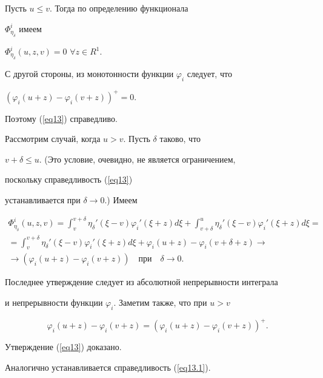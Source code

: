 \begin{pf}


Пусть $u{ \leq} v$. Тогда по определению функционала 


$\Phi^{i}_{\eta_{\delta}}$ имеем


$\Phi^{i}_{\eta_{\delta}}(u, z, v){=}0$ $\forall z \in R^{1}$. 


С другой стороны, из монотонности функции $ \varphi_{i} $ следует, что 


$(\varphi_{i}(u+z)-\varphi_{i}(v+z))^{+}=0$.


Поэтому (\ref{eq13}) справедливо.





Рассмотрим случай, когда $u > v$. Пусть $\delta$ таково, что


$v+\delta \leq u$. (Это условие, очевидно, не является ограничением, 


поскольку справедливость (\ref{eq13}) 


устанавливается при $\delta \rightarrow 0$.) Имеем 


\begin{multline*}


\Phi_{\eta_{\delta}}^{i}(u,z,v) = \int_{v}^{v+\delta}


{\eta_{\delta}}'(\xi-v) {\varphi_{i}}' (\xi+z) d \xi+


\int_{v+\delta}^{u}


{\eta_{\delta}}'(\xi-v) {\varphi_{i}}' (\xi+z) d \xi= \\


%


\displaystyle


=\int_{v}^{v+\delta}


{\eta_{\delta}}'(\xi-v) {\varphi_{i}}' (\xi+z) d \xi+


\varphi_{i}(u+z)-\varphi_{i}(v+\delta+z) \rightarrow \\


%


\rightarrow (\varphi_{i} (u+z)-\varphi_{i}(v+z))


\quad \text{при} \quad \delta \rightarrow 0.


\end{multline*}


Последнее утверждение следует из абсолютной непрерывности интеграла


и непрерывности функции $\varphi_{i}$. Заметим также, что при $u > v$ 


$$ 


\varphi_{i}(u+z)-\varphi_{i}(v+z)=(\varphi_{i} (u+z)-\varphi_{i}(v+z))^{+}.


$$


Утверждение (\ref{eq13}) доказано.


Аналогично устанавливается справедливость (\ref{eq13.1}).


\end{pf}





